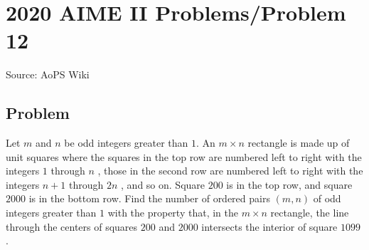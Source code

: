 \documentclass[12pt]{article}
\begin{document}
\section*{{2020 AIME II Problems/Problem 12}}
Source: AoPS Wiki

\subsection*{Problem}
Let $m$ and $n$ be odd integers greater than $1.$ An $m\times n$ rectangle is made up of unit squares where the squares in the top row are numbered left to right with the integers $1$ through $n$ , those in the second row are numbered left to right with the integers $n + 1$ through $2n$ , and so on. Square $200$ is in the top row, and square $2000$ is in the bottom row. Find the number of ordered pairs $(m,n)$ of odd integers greater than $1$ with the property that, in the $m\times n$ rectangle, the line through the centers of squares $200$ and $2000$ intersects the interior of square $1099$ .
\end{document}
